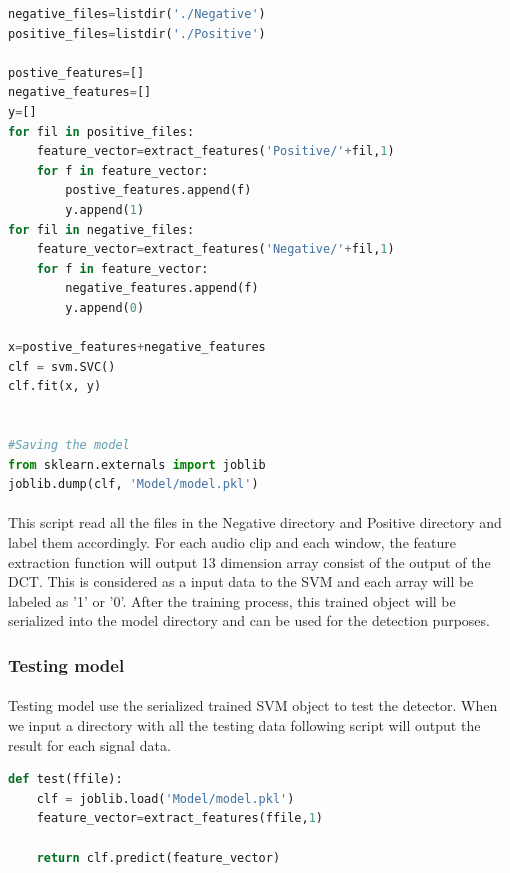 \documentclass[12pt]{article}
\numberwithin{figure}{section}
\numberwithin{table}{section}
\begin{document}
\begin{lstlisting}[language=Python]
negative_files=listdir('./Negative')
positive_files=listdir('./Positive')

postive_features=[]
negative_features=[]
y=[]
for fil in positive_files:
    feature_vector=extract_features('Positive/'+fil,1)
    for f in feature_vector:
        postive_features.append(f)
        y.append(1)
for fil in negative_files:
    feature_vector=extract_features('Negative/'+fil,1)
    for f in feature_vector:
        negative_features.append(f)
        y.append(0)

x=postive_features+negative_features
clf = svm.SVC()
clf.fit(x, y)


#Saving the model
from sklearn.externals import joblib
joblib.dump(clf, 'Model/model.pkl')
\end{lstlisting}

\paragraph{}
This script read all the files in the Negative directory and Positive directory and label them accordingly. For each audio clip and each window, the feature extraction function will output 13 dimension array consist of the output of the DCT. This is considered as a input data to the SVM and each array will be labeled as '1' or '0'. After the training process, this trained object will be serialized into the model directory and can be used for the detection purposes.

\subsubsection{Testing model}
\paragraph{}
Testing model use the serialized trained SVM object to test the detector. When we input a directory with all the testing data following script will output the result for each signal data.  
\begin{lstlisting}[language=Python]
def test(ffile):
    clf = joblib.load('Model/model.pkl')
    feature_vector=extract_features(ffile,1)
    
    return clf.predict(feature_vector)

\end{lstlisting}
\end{document}
